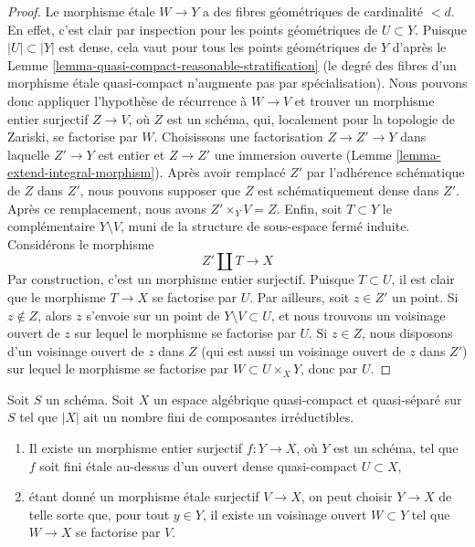 \begin{proof}
\medskip\noindent
Le morphisme étale $W \to Y$ a des fibres géométriques de cardinalité $< d$.
En effet, c'est clair par inspection pour les points géométriques de
$U \subset Y$. Puisque $|U| \subset |Y|$ est dense, cela vaut pour tous les
points géométriques de $Y$ d'après le
Lemme \ref{lemma-quasi-compact-reasonable-stratification}
(le degré des fibres d'un morphisme étale quasi-compact n'augmente pas par
spécialisation). Nous pouvons donc appliquer l'hypothèse de récurrence à
$W \to V$ et trouver un morphisme entier surjectif $Z \to V$, où $Z$ est un
schéma, qui, localement pour la topologie de Zariski, se factorise par $W$.
Choisissons une factorisation $Z \to Z' \to Y$ dans laquelle $Z' \to Y$ est
entier et $Z \to Z'$ une immersion ouverte
(Lemme \ref{lemma-extend-integral-morphism}).
Après avoir remplacé $Z'$ par l'adhérence schématique de $Z$ dans $Z'$,
nous pouvons supposer que $Z$ est schématiquement dense dans $Z'$.
Après ce remplacement, nous avons $Z' \times_Y V = Z$. Enfin, soit
$T \subset Y$ le complémentaire $Y \setminus V$, muni de la structure de
sous-espace fermé induite. Considérons le morphisme
$$
Z' \amalg T \longrightarrow X
$$
Par construction, c'est un morphisme entier surjectif.
Puisque $T \subset U$, il est clair que le morphisme $T \to X$ se factorise
par $U$. Par ailleurs, soit $z \in Z'$ un point. Si $z \not \in Z$, alors $z$
s'envoie sur un point de $Y \setminus V \subset U$, et nous trouvons un
voisinage ouvert de $z$ sur lequel le morphisme se factorise par $U$.
Si $z \in Z$, nous disposons d'un voisinage ouvert de $z$ dans $Z$
(qui est aussi un voisinage ouvert de $z$ dans $Z'$) sur lequel le morphisme
se factorise par $W \subset U \times_X Y$, donc par $U$.
\end{proof}

\begin{lemma}
\label{lemma-there-is-a-scheme-integral-over-refined}
Soit $S$ un schéma. Soit $X$ un espace algébrique quasi-compact et
quasi-séparé sur $S$ tel que $|X|$ ait un nombre fini de composantes
irréductibles.
\begin{enumerate}
\item Il existe un morphisme entier surjectif $f : Y \to X$, où $Y$ est un
schéma, tel que $f$ soit fini étale au-dessus d'un ouvert dense quasi-compact
$U \subset X$,
\item étant donné un morphisme étale surjectif $V \to X$, on peut choisir
$Y \to X$ de telle sorte que, pour tout $y \in Y$, il existe un voisinage
ouvert $W \subset Y$ tel que $W \to X$ se factorise par $V$.
\end{enumerate}
\end{lemma}

